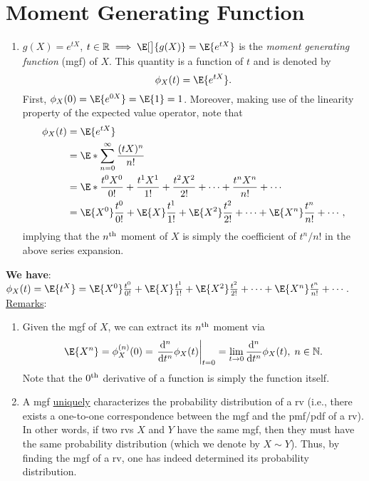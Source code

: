 \section*{Moment Generating Function}
\begin{Regular}
    \begin{enumerate}[4.]
        \item $ g(X)=e^{tX} $, $ t\in\mathbb{R}\implies \E[\big]{g(X)}=\E{e^{tX}} $ is the \emph{moment generating function} (mgf) of $ X $.
              This quantity is a function of $ t $ and is denoted by
              \[ \phi_X(t)=\E{e^{tX}}. \]
              First, $ \phi_X(0)=\E{e^{0X}}=\E{1}=1 $. Moreover, making use of the linearity property of the expected value operator, note that
              \begin{align*}
                  \phi_X(t)
                   & =\E{e^{tX}}                                                                                               \\
                   & =\E*{\sum_{n=0}^{\infty} \frac{(tX)^n}{n!} }                                                              \\
                   & =\E*{\frac{t^0X^0}{0!}+\frac{t^1X^1}{1!} +\frac{t^2X^2}{2!} +\cdots+\frac{t^n X^n}{n!} +\cdots }          \\
                   & =\E{X^0}\frac{t^0}{0!} +\E{X}\frac{t^1}{1!} +\E{X^2}\frac{t^2}{2!} +\cdots+\E{X^n}\frac{t^n}{n!} +\cdots,
              \end{align*}
              implying that the $ n\textsuperscript{th} $ moment of $ X $ is simply the coefficient of $ t^n/n! $ in the above series expansion.
    \end{enumerate}
    \textbf{We have}: $ \phi_X(t)=\E{t^X}=\E{X^0}\frac{t^0}{0!} +\E{X}\frac{t^1}{1!} +\E{X^2}\frac{t^2}{2!} +\cdots+\E{X^n}\frac{t^n}{n!}+\cdots $.
    \tcblower{}
    \underline{Remarks}:
    \begin{enumerate}[(1)]
        \item Given the mgf of $ X $, we can extract its $ n\textsuperscript{th} $ moment via
              \[ \E{X^n}=\phi_X^{(n)}(0)=\odv*[order=n]{\phi_X(t)}{t}_{t=0}=\lim\limits_{{t} \to {0}}\odv*[order=n]{\phi_X(t)}{t},\; n\in\mathbb{N}.  \]
              Note that the $ 0\textsuperscript{th} $ derivative of a function is simply the function itself.
        \item A mgf \underline{uniquely} characterizes the probability distribution of a rv (i.e., there exists a
              one-to-one correspondence between the mgf and the pmf/pdf of a rv). In other words, if
              two rvs $ X $ and $ Y $ have the same mgf, then they must have the same probability
              distribution (which we denote by $ X \sim Y $). Thus, by finding the mgf of a rv, one has
              indeed determined its probability distribution.
    \end{enumerate}
\end{Regular}
